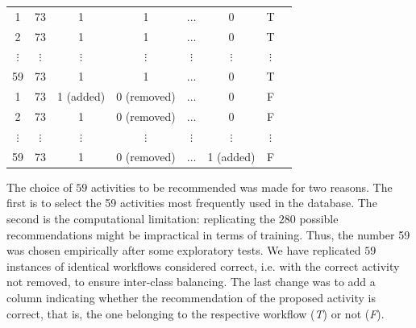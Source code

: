 \documentclass{RITA}
\begin{document}
\begin{table}[!htb]
\begin{center}
\begin{tabular}{cccccccc}
		1                 & 73            & 1                               & 1                               & \(\ldots\)                       & 0                                & T                \\ 
		2                 & 73            & 1                               & 1                               & \(\ldots\)                       & 0                                & T                \\ 
		\(\vdots\)        & \(\vdots\)    & \(\vdots\)                      & \(\vdots\)                      & \(\vdots\)                       & \(\vdots\)                       & \(\vdots\)       \\ 
		59                & 73            & 1                               & 1                               & \(\ldots\)                       & 0                                & T                \\ 
		1                 & 73            & 1 (added)                       & 0 (removed)                     & \(\ldots\)                       & 0                                & F                \\ 
		2                 & 73            & 1                               & 0 (removed)                     & \(\ldots\)                       & 0                                & F                \\ 
		\(\vdots\)        & \(\vdots\)    & \(\vdots\)                      & \(\vdots\)                      & \(\vdots\)                       & \(\vdots\)                       & \(\vdots\)       \\ 
		59                & 73            & 1                               & 0 (removed)                     & \(\ldots\)                       & 1 (added)                        & F                \\ \hline
	\end{tabular}
	\end{center}
\end{table}
The choice of \(59\) activities to be recommended was made for two reasons. The first is to select the 59 activities most frequently used in the database. The second is the computational limitation: replicating the \(280\) possible recommendations might be impractical in terms of training. Thus, the number 59 was chosen empirically after some exploratory tests. We have replicated \(59\) instances of identical workflows considered correct, i.e. with the correct activity not removed, to ensure inter-class balancing. The last change was to add a column indicating whether the recommendation of the proposed activity is correct, that is, the one belonging to the respective workflow (\emph{T}) or not (\emph{F}).
\end{document}
